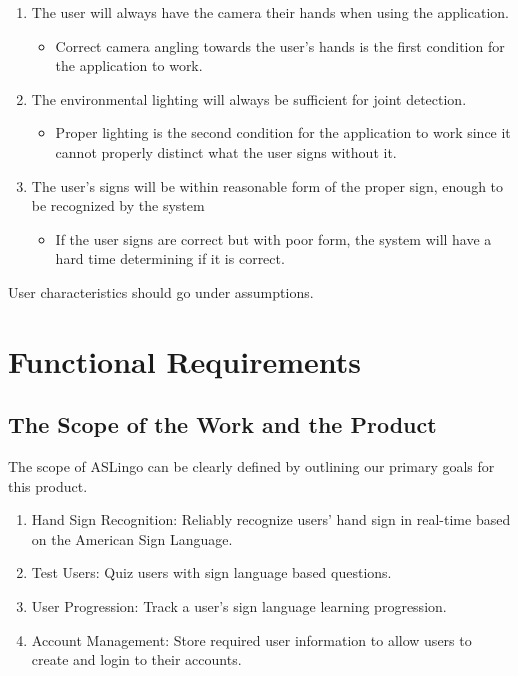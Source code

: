 \documentclass[12pt, titlepage]{article}
\begin{document}
\begin{enumerate}
    \item The user will always have the camera their hands when using the application.
    \begin{itemize}
        \item[] Correct camera angling towards the user's hands is the first condition for the application to work.
    \end{itemize}
    \item The environmental lighting will always be sufficient for joint detection.
    \begin{itemize}
        \item[] Proper lighting is the second condition for the application to work since it cannot properly distinct what the user signs without it.
    \end{itemize}
    \item The user's signs will be within reasonable form of the proper sign, enough to be recognized by the system
    \begin{itemize}
        \item[] If the user signs are correct but with poor form, the system will have a hard time determining if it is correct.
    \end{itemize}
\end{enumerate}


User characteristics should go under assumptions.

\newpage

\section{Functional Requirements}

\subsection{The Scope of the Work and the Product}
The scope of ASLingo can be clearly defined by outlining our primary goals for this product.

\begin{enumerate}
  \item Hand Sign Recognition: Reliably recognize users' hand sign in real-time based on the American Sign Language.
  \item Test Users: Quiz users with sign language based questions.
  \item User Progression: Track a user's sign language learning progression.
  \item Account Management: Store required user information to allow users to create and login to their accounts.
\end{enumerate}
\end{document}
